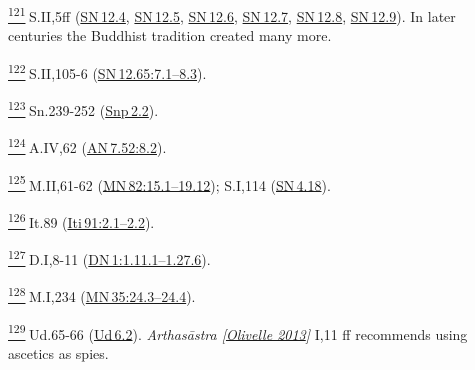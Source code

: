 \label{footprints_split_024.html_fn121}
\hyperref[footprints_split_007.htmlux5cux23fnref121]{\textsuperscript{121}} S.II,5ff
(\href{https://suttacentral.net/sn12.4/en/sujato}{SN\,12.4},
\href{https://suttacentral.net/sn12.5/en/sujato}{SN\,12.5},
\href{https://suttacentral.net/sn12.6/en/sujato}{SN\,12.6},
\href{https://suttacentral.net/sn12.7/en/sujato}{SN\,12.7},
\href{https://suttacentral.net/sn12.8/en/sujato}{SN\,12.8},
\href{https://suttacentral.net/sn12.9/en/sujato}{SN\,12.9}). In later
centuries the Buddhist tradition created many more.

\label{footprints_split_024.html_fn122}
\hyperref[footprints_split_007.htmlux5cux23fnref122]{\textsuperscript{122}} S.II,105-6
(\href{https://suttacentral.net/sn12.65/en/sujato\#7.1}{SN\,12.65:7.1--8.3}).

\label{footprints_split_024.html_fn123}
\hyperref[footprints_split_007.htmlux5cux23fnref123]{\textsuperscript{123}} Sn.239-252
(\href{https://suttacentral.net/snp2.2/en/sujato}{Snp\,2.2}).

\label{footprints_split_024.html_fn124}
\hyperref[footprints_split_007.htmlux5cux23fnref124]{\textsuperscript{124}} A.IV,62
(\href{https://suttacentral.net/an7.52/en/sujato\#8.2}{AN\,7.52:8.2}).

\label{footprints_split_024.html_fn125}
\hyperref[footprints_split_007.htmlux5cux23fnref125]{\textsuperscript{125}} M.II,61-62
(\href{https://suttacentral.net/mn82/en/sujato\#15.1}{MN\,82:15.1--19.12});
S.I,114 (\href{https://suttacentral.net/sn4.18/en/sujato}{SN\,4.18}).

\label{footprints_split_024.html_fn126}
\hyperref[footprints_split_007.htmlux5cux23fnref126]{\textsuperscript{126}} It.89
(\href{https://suttacentral.net/iti91/en/sujato\#2.1}{Iti\,91:2.1--2.2}).

\label{footprints_split_024.html_fn127}
\hyperref[footprints_split_007.htmlux5cux23fnref127]{\textsuperscript{127}} D.I,8-11
(\href{https://suttacentral.net/dn1/en/sujato\#1.11.1}{DN\,1:1.11.1--1.27.6}).

\label{footprints_split_024.html_fn128}
\hyperref[footprints_split_007.htmlux5cux23fnref128]{\textsuperscript{128}} M.I,234
(\href{https://suttacentral.net/mn35/en/sujato\#24.3}{MN\,35:24.3--24.4}).

\label{footprints_split_024.html_fn129}
\hyperref[footprints_split_007.htmlux5cux23fnref129]{\textsuperscript{129}} Ud.65-66
(\href{https://suttacentral.net/ud6.2/en/sujato}{Ud\,6.2}).
\emph{{Arthasāstra
{{[}\hyperref[footprints_split_022.htmlux5cux23Olivelleux5cux25202013]{Olivelle
2013}{]}}}} I,11 ff recommends using ascetics as spies.

